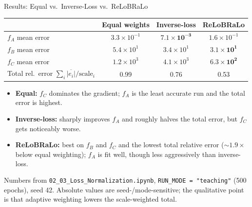 \documentclass[aspectratio=169,11pt]{beamer}
\newcommand{\emphc}[1]{\textcolor{harvardcrimson}{#1}}
\begin{document}
\begin{frame}{Results: Equal vs.\ Inverse-Loss vs.\ ReLoBRaLo}
\footnotesize
\begin{center}
\renewcommand{\arraystretch}{1.05}
{\footnotesize
\begin{tabular}{@{}lccc@{}}
\toprule
 & \textbf{Equal weights} & \textbf{Inverse-loss} & \textbf{ReLoBRaLo} \\
\midrule
$f_A$ mean error & $3.3 \times 10^{-1}$ & $\bm{7.1 \times 10^{-3}}$ & $1.6 \times 10^{-1}$ \\
$f_B$ mean error & $5.4 \times 10^{1}$ & $3.4 \times 10^{1}$ & $\bm{3.1 \times 10^{1}}$ \\
$f_C$ mean error & $1.2 \times 10^{3}$ & $4.1 \times 10^{3}$ & $\bm{6.3 \times 10^{2}}$ \\
\midrule
Total rel.\ error $\sum_i \overline{|e_i|}/\text{scale}_i$ & 0.99 & 0.76 & \emphc{0.53} \\
\bottomrule
\end{tabular}
}
\end{center}

\vspace{0.15cm}
\begin{itemize}\itemsep1pt
    \item \textbf{Equal:} $f_C$ dominates the gradient; $f_A$ is the \emphc{least accurate} run and the total error is highest.
    \item \textbf{Inverse-loss:} sharply improves $f_A$ and roughly halves the total error, but $f_C$ gets noticeably worse.
    \item \textbf{ReLoBRaLo:} best on $f_B$ and $f_C$ and the \emphc{lowest total relative error} ($\sim 1.9\times$ below equal weighting); $f_A$ is fit well, though less aggressively than inverse-loss.
\end{itemize}

\vspace{0.1cm}
{\scriptsize Numbers from \texttt{02\_03\_Loss\_Normalization.ipynb}, \texttt{RUN\_MODE = "teaching"} (500 epochs), seed 42.  Absolute values are seed-/mode-sensitive; the qualitative point is that adaptive weighting lowers the scale-weighted total.}
\end{frame}
\end{document}
